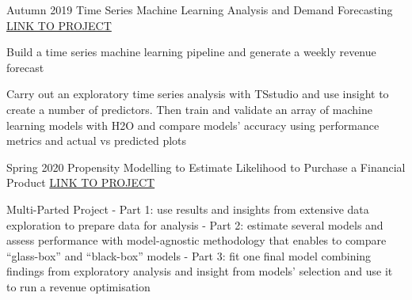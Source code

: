 \begin{cventries}
  \cventry
    {Autumn 2019} %
    {Time Series Machine Learning Analysis and Demand Forecasting} %
    {\href{https://diegousai.io/2019/12/time-series-machine-learning-analysis-and-demand-forecasting/}{LINK TO PROJECT}} %
    {} %
    {
      \begin{cvitems} %
        \item {Build a time series machine learning pipeline and generate a weekly revenue forecast}
        \item {Carry out an exploratory time series analysis with TSstudio and use insight to create a number of predictors. Then train and validate an array of machine learning models with H2O and compare models’ accuracy using performance metrics and actual vs predicted plots}
      \end{cvitems}
    }
    
  \cventry
    {Spring 2020} %
    {Propensity Modelling to Estimate Likelihood to Purchase a Financial Product} %
    {\href{https://diegousai.io/2020/05/propensity-modelling-abridged/}{LINK TO PROJECT}} %
    {} %
    {
      \begin{cvitems} %
        \item {Multi-Parted Project - Part 1: use results and insights from extensive data exploration to prepare data for analysis - Part 2: estimate several models and assess performance with model-agnostic methodology that enables to compare “glass-box” and “black-box” models - Part 3: fit one final model combining findings from exploratory analysis and insight from models’ selection and use it to run a revenue optimisation}
      \end{cvitems}
    }

\end{cventries}

